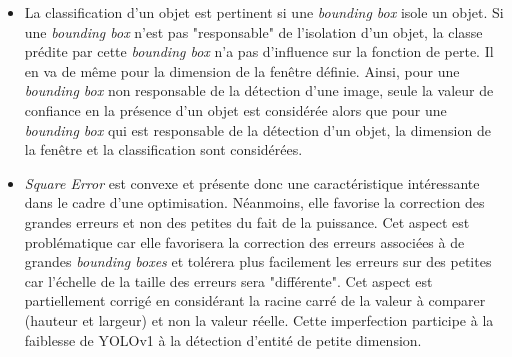 \begin{itemize}
    \item La classification d'un objet est pertinent si une \textit{bounding box} isole un objet. Si une \textit{bounding box} n'est pas "responsable" de l'isolation d'un objet, la classe prédite par cette \textit{bounding box} n'a pas d'influence sur la fonction de perte. Il en va de même pour la dimension de la fenêtre définie. Ainsi, pour une \textit{bounding box} non responsable de la détection d'une image, seule la valeur de confiance en la présence d'un objet est considérée alors que pour une \textit{bounding box} qui est responsable de la détection d'un objet, la dimension de la fenêtre et la classification sont considérées.

    \item \textit{Square Error} est convexe et présente donc une caractéristique intéressante dans le cadre d'une optimisation. Néanmoins, elle favorise la correction des grandes erreurs et non des petites du fait de la puissance. Cet aspect est problématique car elle favorisera la correction des erreurs associées à de grandes \textit{bounding boxes} et tolérera plus facilement les erreurs sur des petites car l'échelle de la taille des erreurs sera "différente". Cet aspect est partiellement corrigé en considérant la racine carré de la valeur à comparer (hauteur et largeur) et non la valeur réelle. Cette imperfection participe à la faiblesse de YOLOv1 à la détection d'entité de petite dimension.
\end{itemize}


